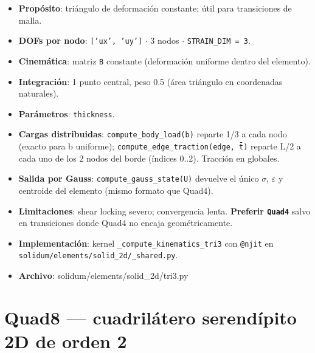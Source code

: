 \documentclass[11pt,letterpaper,oneside]{report}
\begin{document}
\begin{itemize}
  \item \textbf{Propósito}: triángulo de deformación constante; útil para transiciones de malla.
  \item \textbf{DOFs por nodo}: \texttt{['ux', 'uy']} \ensuremath{\cdot} 3 nodos \ensuremath{\cdot} \texttt{STRAIN\_DIM = 3}.
  \item \textbf{Cinemática}: matriz \texttt{B} constante (deformación uniforme dentro del elemento).
  \item \textbf{Integración}: 1 punto central, peso 0.5 (área triángulo en coordenadas naturales).
  \item \textbf{Parámetros}: \texttt{thickness}.
  \item \textbf{Cargas distribuidas}: \texttt{compute\_body\_load(b)} reparte 1/3 a cada nodo (exacto para b uniforme); \texttt{compute\_edge\_traction(edge, t̄)} reparte L/2 a cada uno de los 2 nodos del borde (índices 0..2). Tracción en globales.
  \item \textbf{Salida por Gauss}: \texttt{compute\_gauss\_state(U)} devuelve el único \ensuremath{\sigma}, \ensuremath{\varepsilon} y centroide del elemento (mismo formato que Quad4).
  \item \textbf{Limitaciones}: shear locking severo; convergencia lenta. \textbf{Preferir \texttt{Quad4}} salvo en transiciones donde Quad4 no encaja geométricamente.
  \item \textbf{Implementación}: kernel \texttt{\_compute\_kinematics\_tri3} con \texttt{@njit} en \texttt{solidum/elements/solid\_2d/\_shared.py}.
  \item \textbf{Archivo}: solidum/elements/solid\_2d/tri3.py
\end{itemize}


\section{Quad8 --- cuadrilátero serendípito 2D de orden 2}
\end{document}

